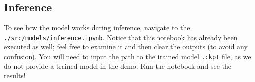 \subsection{Inference}\label{inference}

To see how the model works during inference, navigate
to the \texttt{./src/models/inference.ipynb}. Notice
that this notebook has already been executed as well; feel free to examine it and then
clear the outputs (to avoid any confusion). You will need to
input the path to the trained model \texttt{.ckpt} file, as we do
not provide a trained model in the demo. Run the notebook and
see the results!